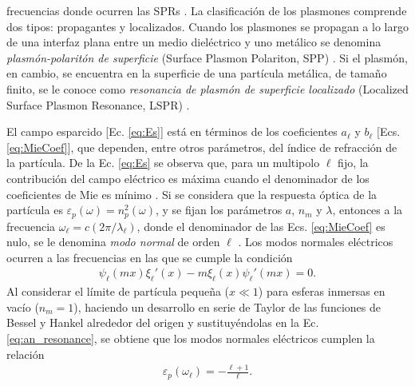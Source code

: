 	
	

	
	
	

 frecuencias donde ocurren las SPRs \cite{stockman2011nanoplasmonics}.  La clasificación de los plasmones comprende  dos tipos: propagantes y localizados.  Cuando los plasmones se propagan a lo largo de una interfaz plana entre un medio diel\'ectrico y uno met\'alico se denomina  \emph{plasm\'on-polarit\'on de superficie} (Surface Plasmon Polariton, SPP) \cite{maier2007plasmonics}.  Si el plasmón, en cambio, se encuentra en la superficie de una partícula  met\'alica, de tamaño finito, se le conoce como \emph{resonancia de plasm\'on de superficie localizado} (Localized Surface Plasmon Resonance, LSPR) \cite{maier2007plasmonics}. 













	El campo esparcido [Ec.  \eqref{eq:Es}] está en términos de los coeficientes $a_\ell$ y $b_\ell$ [Ecs.  \eqref{eq:MieCoef}], que dependen, entre otros parámetros, del índice de refracción de la partícula.  De la Ec.  \eqref{eq:Es} se observa que, para un multipolo $\ell$ fijo, la contribución del campo eléctrico es máxima cuando el denominador de los coeficientes de Mie es mínimo \cite{novotny2006principles}.  Si se considera que la respuesta óptica de la partícula es 	$\varepsilon_p (\omega) = n_p^2 (\omega)$, y se fijan los parámetros $a$, $n_m$ y $\lambda$, 	entonces a la frecuencia $\omega_\ell = c (2\pi / \lambda_\ell)$, donde el denominador de las Ecs.  \eqref{eq:MieCoef} es nulo, se le denomina \emph{modo normal} de orden $\ell$ \cite{bohren1998absorption,maciel2017momentum}.  Los modos normales eléctricos ocurren a las frecuencias en las que se cumple la condición 
	\begin{align}
	\psi_\ell(mx)\xi_\ell'(x)-m\xi_\ell(x)\psi_\ell'(mx) = 0. 
	\label{eq:an_resonance}
	\end{align}
Al considerar el límite de partícula pequeña ($x\ll 1$) para esferas inmersas en vacío ($n_m=1$), haciendo un desarrollo en serie de Taylor de las funciones de Bessel y Hankel alrededor del origen y sustituyéndolas en la Ec.  \eqref{eq:an_resonance}, se obtiene que los modos normales eléctricos cumplen la relación \cite{maciel2017momentum}
	\begin{align}
	\varepsilon_p(\omega_\ell) = - \frac{\ell+1}{\ell}.  
	\label{eq:NormalModes}
	\end{align}

